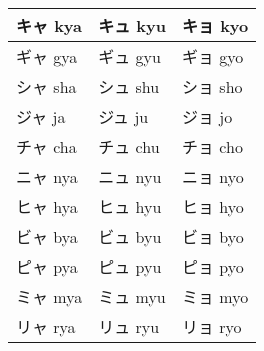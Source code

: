 \documentclass{article}
\begin{document}
{\begin{minipage}{\textwidth}
\begin{minipage}[t]{.49\textwidth}
{\begin{tabular}[t]{|l|l|l|}
        \hline
        キャ   kya & キュ   kyu & キョ   kyo \\ \hline
        ギャ   gya & ギュ   gyu & ギョ   gyo \\ \hline
        シャ   sha & シュ   shu & ショ   sho \\ \hline
        ジャ   ja  & ジュ   ju  & ジョ   jo  \\ \hline
        チャ   cha & チュ   chu & チョ   cho \\ \hline
        ニャ   nya & ニュ   nyu & ニョ   nyo \\ \hline
        ヒャ   hya & ヒュ   hyu & ヒョ   hyo \\ \hline
        ビャ   bya & ビュ   byu & ビョ   byo \\ \hline
        ピャ   pya & ピュ   pyu & ピョ   pyo \\ \hline
        ミャ   mya & ミュ   myu & ミョ   myo \\ \hline
        リャ   rya & リュ   ryu & リョ   ryo \\ \hline
        \end{tabular}
      }
    \end{minipage}
  \end{minipage}
}

\pagebreak

\end{document}

